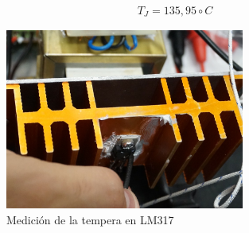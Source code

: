 \begin{equation}
  \begin{aligned}
    T_J = 135,95 \circ C
  \end{aligned}
\end{equation}

   
\begin{figure}[H]
  \centering
  \includegraphics[width=0.70\textwidth]{images/medicionTemperatura.png}
  \caption{Medición de la tempera en LM317}
\end{figure}

